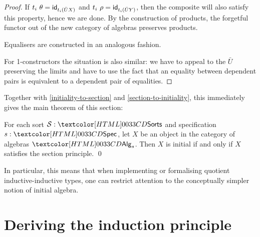 \begin{proof}
  If $t_i\ \theta = \mathsf{id}_{t_i (\bar{U}X)}$ and
  $t_i\ \rho = \mathsf{id}_{t_i (\bar{U}Y)}$, then the composite will also
  satisfy this property, hence we are done. By the construction of
  products, the forgetful functor out of the new category of algebras
  preserves products.

  Equalisers are constructed in an analogous fashion.

  For 1-constructors the situation is also similar: we have to appeal
  to the $\bar{U}$ preserving the limits and have to use the fact that
  an equality between dependent pairs is equivalent to a dependent
  pair of equalities.
\end{proof}

Together with \cref{initiality-to-section} and
\cref{section-to-initiality}, this immediately gives the main theorem
of this section:

\begin{theorem}
\label{thm:main}
  For each sort $\Ss : \Sorts$ and specification $s : \Spec$, let $X$
  be an object in the category of algebras $\Alg_s$. Then $X$ is
  initial if and only if $X$ satisfies the section principle. \qed
\end{theorem}

In particular, this means that when implementing or formalising
quotient inductive-inductive types, one can restrict attention to the
conceptually simpler notion of initial algebra.

\section{Deriving the induction principle}
